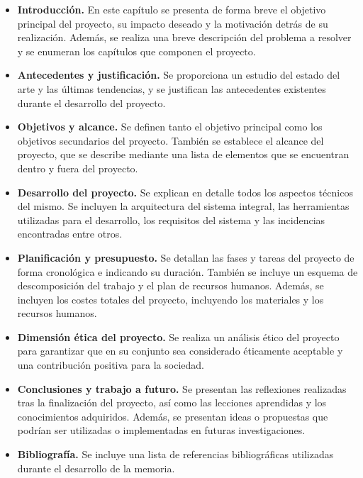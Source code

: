 \begin{itemize}
    \item \textbf{Introducción.} En este capítulo se presenta de forma breve el objetivo 
    principal del proyecto, su impacto deseado y la motivación detrás de su realización. 
    Además, se realiza una  breve descripción del problema a resolver y se enumeran
    los capítulos que componen el proyecto.
    \item \textbf{Antecedentes y justificación.} Se proporciona un estudio del estado del 
    arte y las últimas tendencias, y se justifican las antecedentes existentes durante el 
    desarrollo del proyecto.
    \item \textbf{Objetivos y alcance.} Se definen tanto el objetivo 
    principal como los objetivos secundarios del proyecto. También se establece el alcance 
    del proyecto, que se describe mediante una lista de elementos que se encuentran 
    dentro y fuera del proyecto.
    \item \textbf{Desarrollo del proyecto.} Se explican en detalle todos los aspectos técnicos del mismo. 
    Se incluyen la arquitectura del sistema integral, las herramientas utilizadas para el desarrollo, 
    los requisitos del sistema y las incidencias encontradas entre otros.
    \item \textbf{Planificación y presupuesto.} Se detallan las fases y tareas del proyecto de forma
    cronológica e indicando su duración. También se incluye un esquema de descomposición 
    del trabajo y el plan de recursos humanos. Además, se incluyen los costes totales del proyecto, 
    incluyendo los materiales y los recursos humanos.
    \item \textbf{Dimensión ética del proyecto.} Se realiza un análisis ético del proyecto 
    para garantizar que en su conjunto sea considerado éticamente aceptable y una contribución positiva 
    para la sociedad.
    \item \textbf{Conclusiones y trabajo a futuro.} Se presentan las reflexiones realizadas 
    tras la finalización del proyecto, así como las lecciones aprendidas y los conocimientos 
    adquiridos. Además, se presentan ideas o propuestas que podrían ser utilizadas o implementadas 
    en futuras investigaciones.
    \item \textbf{Bibliografía.} Se incluye una lista de referencias bibliográficas utilizadas
    durante el de\-sarro\-llo de la memoria.
\end{itemize}



\pagebreak